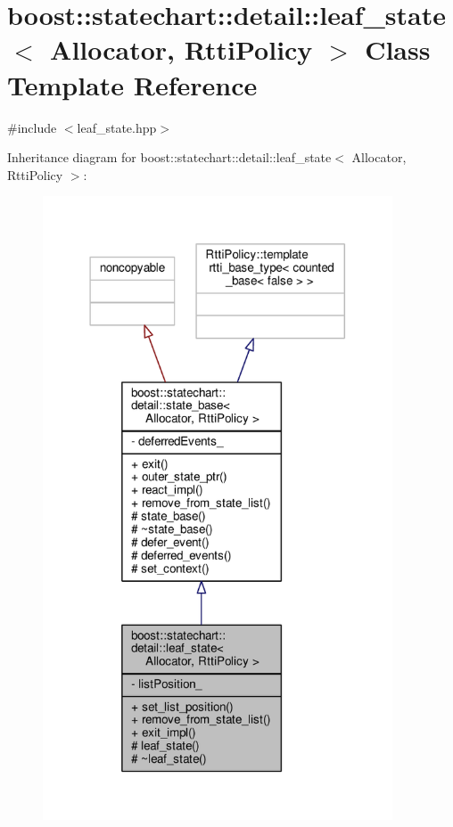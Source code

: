\hypertarget{classboost_1_1statechart_1_1detail_1_1leaf__state}{}\section{boost\+:\+:statechart\+:\+:detail\+:\+:leaf\+\_\+state$<$ Allocator, Rtti\+Policy $>$ Class Template Reference}
\label{classboost_1_1statechart_1_1detail_1_1leaf__state}


{\ttfamily \#include $<$leaf\+\_\+state.\+hpp$>$}



Inheritance diagram for boost\+:\+:statechart\+:\+:detail\+:\+:leaf\+\_\+state$<$ Allocator, Rtti\+Policy $>$\+:
\nopagebreak
\begin{figure}[H]
\begin{center}
\leavevmode
\includegraphics[width=294pt]{classboost_1_1statechart_1_1detail_1_1leaf__state__inherit__graph}
\end{center}
\end{figure}


